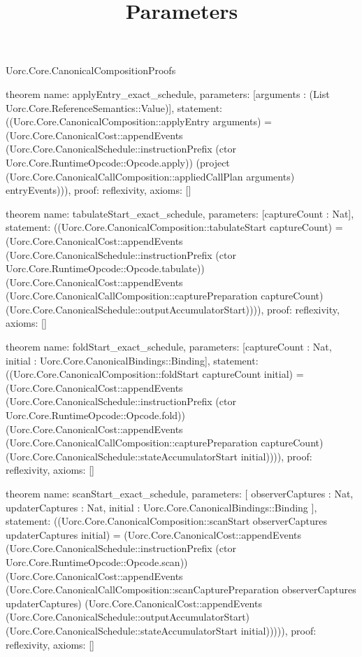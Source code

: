 \begin{lexlean}{Uorc.Core.CanonicalCompositionProofs}
\title{Parameters}
\begin{semanticmodule}
theorem{
  name: applyEntry_exact_schedule,
  parameters: [arguments : (List Uorc.Core.ReferenceSemantics::Value)],
  statement: ((Uorc.Core.CanonicalComposition::applyEntry arguments) = (Uorc.Core.CanonicalCost::appendEvents (Uorc.Core.CanonicalSchedule::instructionPrefix (ctor Uorc.Core.RuntimeOpcode::Opcode.apply)) (project (Uorc.Core.CanonicalCallComposition::appliedCallPlan arguments) entryEvents))),
  proof: reflexivity{},
  axioms: []
}

theorem{
  name: tabulateStart_exact_schedule,
  parameters: [captureCount : Nat],
  statement: ((Uorc.Core.CanonicalComposition::tabulateStart captureCount) = (Uorc.Core.CanonicalCost::appendEvents (Uorc.Core.CanonicalSchedule::instructionPrefix (ctor Uorc.Core.RuntimeOpcode::Opcode.tabulate)) (Uorc.Core.CanonicalCost::appendEvents (Uorc.Core.CanonicalCallComposition::capturePreparation captureCount) (Uorc.Core.CanonicalSchedule::outputAccumulatorStart)))),
  proof: reflexivity{},
  axioms: []
}

theorem{
  name: foldStart_exact_schedule,
  parameters: [captureCount : Nat, initial : Uorc.Core.CanonicalBindings::Binding],
  statement: ((Uorc.Core.CanonicalComposition::foldStart captureCount initial) = (Uorc.Core.CanonicalCost::appendEvents (Uorc.Core.CanonicalSchedule::instructionPrefix (ctor Uorc.Core.RuntimeOpcode::Opcode.fold)) (Uorc.Core.CanonicalCost::appendEvents (Uorc.Core.CanonicalCallComposition::capturePreparation captureCount) (Uorc.Core.CanonicalSchedule::stateAccumulatorStart initial)))),
  proof: reflexivity{},
  axioms: []
}

theorem{
  name: scanStart_exact_schedule,
  parameters: [
    observerCaptures : Nat,
    updaterCaptures : Nat,
    initial : Uorc.Core.CanonicalBindings::Binding
  ],
  statement: ((Uorc.Core.CanonicalComposition::scanStart observerCaptures updaterCaptures initial) = (Uorc.Core.CanonicalCost::appendEvents (Uorc.Core.CanonicalSchedule::instructionPrefix (ctor Uorc.Core.RuntimeOpcode::Opcode.scan)) (Uorc.Core.CanonicalCost::appendEvents (Uorc.Core.CanonicalCallComposition::scanCapturePreparation observerCaptures updaterCaptures) (Uorc.Core.CanonicalCost::appendEvents (Uorc.Core.CanonicalSchedule::outputAccumulatorStart) (Uorc.Core.CanonicalSchedule::stateAccumulatorStart initial))))),
  proof: reflexivity{},
  axioms: []
}


\end{semanticmodule}
\end{lexlean}
